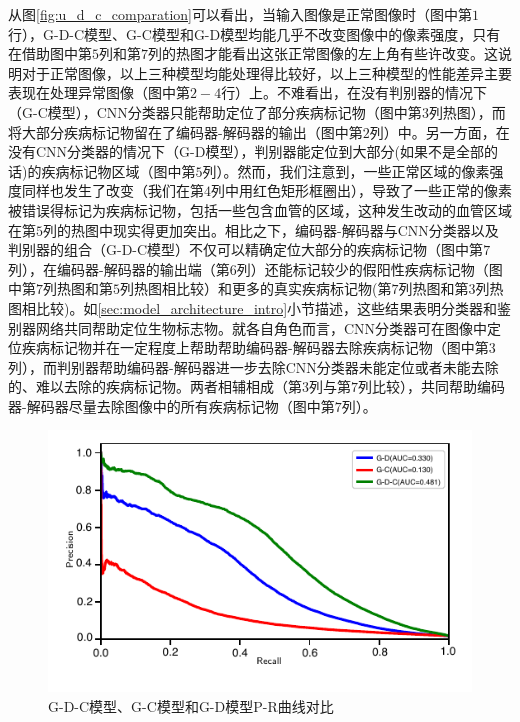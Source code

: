 从图\ref{fig:u_d_c_comparation}可以看出，当输入图像是正常图像时（图中第$1$行），G-D-C模型、G-C模型和G-D模型均能几乎不改变图像中的像素强度，只有在借助图中第$5$列和第$7$列的热图才能看出这张正常图像的左上角有些许改变。这说明对于正常图像，以上三种模型均能处理得比较好，以上三种模型的性能差异主要表现在处理异常图像（图中第$2-4$行）上。不难看出，在没有判别器的情况下（G-C模型），CNN分类器只能帮助定位了部分疾病标记物（图中第$3$列热图），而将大部分疾病标记物留在了编码器-解码器的输出（图中第$2$列）中。另一方面，在没有CNN分类器的情况下（G-D模型），判别器能定位到大部分(如果不是全部的话)的疾病标记物区域（图中第$5$列）。然而，我们注意到，一些正常区域的像素强度同样也发生了改变（我们在第$4$列中用红色矩形框圈出），导致了一些正常的像素被错误得标记为疾病标记物，包括一些包含血管的区域，这种发生改动的血管区域在第$5$列的热图中现实得更加突出。相比之下，编码器-解码器与CNN分类器以及判别器的组合（G-D-C模型）不仅可以精确定位大部分的疾病标记物（图中第$7$列），在编码器-解码器的输出端（第$6$列）还能标记较少的假阳性疾病标记物（图中第$7$列热图和第$5$列热图相比较）和更多的真实疾病标记物(第$7$列热图和第$3$列热图相比较)。如\ref{sec:model_architecture_intro}小节描述，这些结果表明分类器和鉴别器网络共同帮助定位生物标志物。就各自角色而言，CNN分类器可在图像中定位疾病标记物并在一定程度上帮助帮助编码器-解码器去除疾病标记物（图中第$3$列），而判别器帮助编码器-解码器进一步去除CNN分类器未能定位或者未能去除的、难以去除的疾病标记物。两者相辅相成（第$3$列与第$7$列比较），共同帮助编码器-解码器尽量去除图像中的所有疾病标记物（图中第$7$列）。
\begin{figure}[h]
	\centering
	\includegraphics[width=1.0\textwidth]{figure/pr_cureve_u_d_u_c_u_d_c_components.pdf}
	\caption{G-D-C模型、G-C模型和G-D模型P-R曲线对比}
	\label{fig:u_d_c_comparation_pr_curve}
\end{figure}

